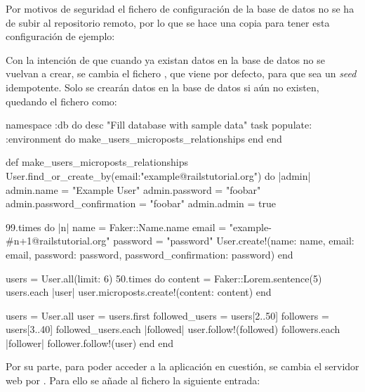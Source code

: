 Por motivos de seguridad el fichero de configuración de la base de datos no se ha de subir al repositorio remoto, por lo que se hace una copia para tener esta configuración de ejemplo:


Con la intención de que cuando ya existan datos en la base de datos no se vuelvan a crear, se cambia el fichero , que viene por defecto, para que sea un \textit{seed} idempotente. Solo se crearán datos en la base de datos si aún no existen, quedando el fichero como:

\begin{codelisting}
\label{code:idempotentseed}
\begin{code}
namespace :db do
  desc "Fill database with sample data"
  task populate: :environment do
    make_users_microposts_relationships
  end
end

def make_users_microposts_relationships
  User.find_or_create_by(email:"example@railstutorial.org") do |admin| 
  	admin.name = "Example User"
	admin.password = "foobar"
        admin.password_confirmation = "foobar"
        admin.admin = true

	99.times do |n|
	    name  = Faker::Name.name
	    email = "example-#{n+1}@railstutorial.org"
	    password  = "password"
	    User.create!(name:     name,
                 email:    email,
                 password: password,
                 password_confirmation: password)
        end

	users = User.all(limit: 6)
  	50.times do
	    content = Faker::Lorem.sentence(5)
	    users.each { |user| user.microposts.create!(content: content) }
	end  

	users = User.all
	user  = users.first
	followed_users = users[2..50]
	followers      = users[3..40]
	followed_users.each { |followed| user.follow!(followed) }
	followers.each      { |follower| follower.follow!(user) }
  end
end
\end{code}
\end{codelisting}

Por su parte, para poder acceder a la aplicación en cuestión, se cambia el servidor web  por . Para ello se añade al fichero  la siguiente entrada:

